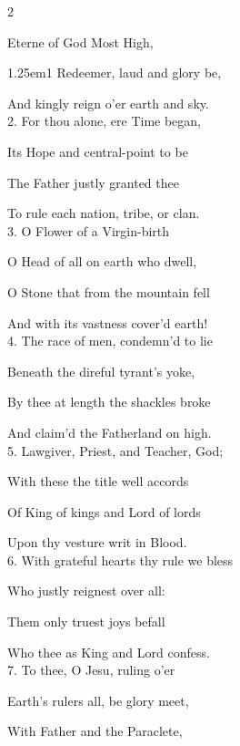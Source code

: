 \begin{paracol}{2}
\mattins
{}

\mattinsInvitatoryHymn
{} Eterne of God Most High,


\begin{hangparas}{1.25em}{1}
Redeemer, laud and glory be,

And kingly reign o’er earth and sky.\\

2. For thou alone, ere Time began,

Its Hope and central-point to be

The Father justly granted thee

To rule each nation, tribe, or clan.\\

3. O Flower of a Virgin-birth

O Head of all on earth who dwell,

O Stone that from the mountain fell

And with its vastness cover'd earth!\\

4. The race of men, condemn'd to lie

Beneath the direful tyrant’s yoke,

By thee at length the shackles broke

And claim'd the Fatherland on high.\\

5. Lawgiver, Priest, and Teacher, God;

With these the title well accords

Of King of kings and Lord of lords

Upon thy vesture writ in Blood.\\

6. With grateful hearts thy rule we bless

Who justly reignest over all:

Them only truest joys befall

Who thee as King and Lord confess.\\

7. To thee, O Jesu, ruling o’er

Earth's rulers all, be glory meet,

With Father and the Paraclete,


\end{hangparas}
\end{paracol}
